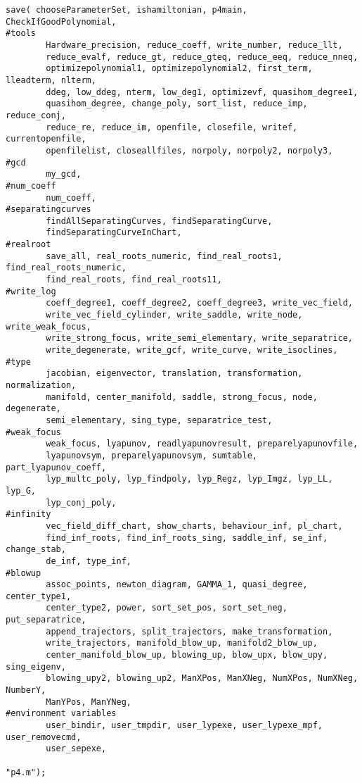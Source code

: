 \documentclass[a4paper,10pt]{article}
\begin{document}
\begin{lstlisting}[name=main]
save( chooseParameterSet, ishamiltonian, p4main, CheckIfGoodPolynomial,
#tools
        Hardware_precision, reduce_coeff, write_number, reduce_llt,
        reduce_evalf, reduce_gt, reduce_gteq, reduce_eeq, reduce_nneq,
        optimizepolynomial1, optimizepolynomial2, first_term, lleadterm, nlterm,
        ddeg, low_ddeg, nterm, low_deg1, optimizevf, quasihom_degree1,
        quasihom_degree, change_poly, sort_list, reduce_imp, reduce_conj,
        reduce_re, reduce_im, openfile, closefile, writef, currentopenfile, 
        openfilelist, closeallfiles, norpoly, norpoly2, norpoly3,
#gcd
        my_gcd,
#num_coeff
        num_coeff,
#separatingcurves
        findAllSeparatingCurves, findSeparatingCurve,
        findSeparatingCurveInChart,
#realroot
        save_all, real_roots_numeric, find_real_roots1, find_real_roots_numeric,
        find_real_roots, find_real_roots11,
#write_log
        coeff_degree1, coeff_degree2, coeff_degree3, write_vec_field,
        write_vec_field_cylinder, write_saddle, write_node, write_weak_focus,
        write_strong_focus, write_semi_elementary, write_separatrice,
        write_degenerate, write_gcf, write_curve, write_isoclines,
#type
        jacobian, eigenvector, translation, transformation, normalization,
        manifold, center_manifold, saddle, strong_focus, node, degenerate,
        semi_elementary, sing_type, separatrice_test,
#weak_focus
        weak_focus, lyapunov, readlyapunovresult, preparelyapunovfile,
        lyapunovsym, preparelyapunovsym, sumtable, part_lyapunov_coeff,
        lyp_multc_poly, lyp_findpoly, lyp_Regz, lyp_Imgz, lyp_LL, lyp_G,
        lyp_conj_poly,
#infinity
        vec_field_diff_chart, show_charts, behaviour_inf, pl_chart,
        find_inf_roots, find_inf_roots_sing, saddle_inf, se_inf, change_stab,
        de_inf, type_inf,
#blowup
        assoc_points, newton_diagram, GAMMA_1, quasi_degree, center_type1,
        center_type2, power, sort_set_pos, sort_set_neg, put_separatrice,
        append_trajectors, split_trajectors, make_transformation,
        write_trajectors, manifold_blow_up, manifold2_blow_up,
        center_manifold_blow_up, blowing_up, blow_upx, blow_upy, sing_eigenv,
        blowing_upy2, blowing_up2, ManXPos, ManXNeg, NumXPos, NumXNeg, NumberY,
        ManYPos, ManYNeg,
#environment variables
        user_bindir, user_tmpdir, user_lypexe, user_lypexe_mpf, user_removecmd,
        user_sepexe,

"p4.m");
\end{lstlisting}
\end{document}
